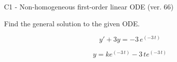 \begin{exercise}
  \begin{exerciseTitle}C1 - Non-homogeneous first-order linear ODE (ver. 66)\end{exerciseTitle}
  \begin{exerciseStatement}
    
Find the general solution to the given ODE.

    
\[y'+3y= -3 \, e^{\left(-3 \, t\right)}\]

  \end{exerciseStatement}
  \begin{exerciseAnswer}
    
\[y= k e^{\left(-3 \, t\right)} - 3 \, t e^{\left(-3 \, t\right)}\]

  \end{exerciseAnswer}
\end{exercise}